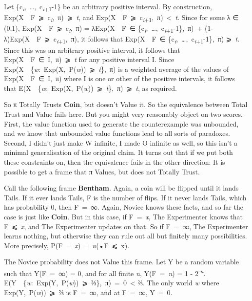 \documentclass[
  10pt,
  letterpaper,
  DIV=11,
  numbers=noendperiod,
  twoside]{scrartcl}
\begin{document}
Let \{c\textsubscript{\emph{i}},~\ldots,~c\textsubscript{\emph{i}+1}-1\}
be an arbitrary positive interval. By construction,
Exp(X~\textbar~F~⩾~c\textsubscript{\emph{i}},~π)~⩾~\emph{t}, and
Exp(X~\textbar~F~⩾~c\textsubscript{\emph{i}+1},~π)~\textless~\emph{t}.
Since for some λ ∈ (0,1),
Exp(X~\textbar~F~⩾~c\textsubscript{\emph{i}},~π) = λExp(X~\textbar~F~∈
\{c\textsubscript{\emph{i}},~\ldots,~c\textsubscript{\emph{i}+1}-1\},~π)~+
(1-λ)Exp(X~\textbar~F~⩾~c\textsubscript{\emph{i}+1},~π), it follows that
Exp(X~\textbar~F~∈
\{c\textsubscript{\emph{i}},~\ldots,~c\textsubscript{\emph{i}+1}-1\},~π)
⩾~\emph{t}. Since this was an arbitrary positive interval, it follows
that Exp(X~\textbar~F~∈~I,~π)~⩾~\emph{t} for any positive interval I.
Since Exp(X~\textbar~\{\emph{w}:~Exp(X,~P(\emph{w}))~⩾~\emph{t}\},~π) is
a weighted average of the values of Exp(X~\textbar~F~∈~I,~π) where I is
one or other of the positive intervals, it follows that
E(X~\textbar~\{\emph{w}:~Exp(X,~P(\emph{w}))~⩾~\emph{t}\},~π)~⩾~\emph{t},
as required.

So π Totally Trusts \textbf{Coin}, but doesn't Value it. So the
equivalence between Total Trust and Value fails here. But you might very
reasonably object on two scores. First, the value function used to
generate the counterexample was unbounded, and we know that unbounded
value functions lead to all sorts of paradoxes. Second, I didn't just
make W infinite, I made O infinite as well, so this isn't a minimal
generalisation of the original claim. It turns out that if we put both
these constraints on, then the equivalence fails in the other direction:
It is possible to get a frame that π Values, but does not Totally Trust.

Call the following frame \textbf{Bentham}. Again, a coin will be flipped
until it lands Tails. If it ever lands Tails, F is the number of flips.
If it never lands Tails, which has probability 0, then F~=~∞. Again,
Novice knows these facts, and so far the case is just like
\textbf{Coin}. But in this case, if F~=~\emph{x}, The Experimenter knows
that F~⩽~\emph{x}, and The Experimenter updates on that. So if F~=~∞,
The Experimenter learns nothing, but otherwise they can rule out all but
finitely many possibilities. More precisely,
P(F~=~\emph{x})~=~π(•\textbar F~⩽~x).

The Novice probability does not Value this frame. Let Y be a random
variable such that Y(F~=~∞) = 0, and for all finite \emph{n},
Y(F~=~\emph{n}) = 1 - 2\textsuperscript{-\emph{n}}.
E(Y~\textbar~\{\emph{w}:~Exp(Y,~P(\emph{w}))~⩾~⅔\},~π)~=~0~\textless{}
⅔. The only world \emph{w} where Exp(Y,~P(\emph{w}))~⩾~⅔ is F~=~∞, and
at F~=~∞, Y~=~0.
\end{document}
